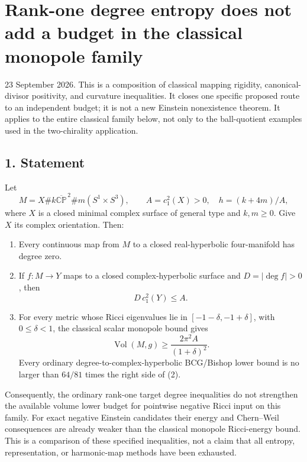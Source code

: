 \documentclass[
  11pt,
]{article}
\author{}
\date{23 September 2026}
\providecommand{\tightlist}{%
  \setlength{\itemsep}{0pt}\setlength{\parskip}{0pt}}
\begin{document}
\hypertarget{rank-one-degree-entropy-does-not-add-a-budget-in-the-classical-monopole-family}{%
\section{Rank-one degree entropy does not add a budget in the classical
monopole
family}\label{rank-one-degree-entropy-does-not-add-a-budget-in-the-classical-monopole-family}}

23 September 2026. This is a composition of classical mapping rigidity,
canonical-divisor positivity, and curvature inequalities. It closes one
specific proposed route to an independent budget; it is not a new
Einstein nonexistence theorem. It applies to the entire classical family
below, not only to the ball-quotient examples used in the two-chirality
application.

\hypertarget{statement}{%
\subsection{1. Statement}\label{statement}}

Let \[
 M=X\#k\overline{\mathbb {CP}}^{\,2}\#m(S^1\times S^3),\qquad
 A=c_1^2(X)>0,\quad h=(k+4m)/A,
\] where \(X\) is a closed minimal complex surface of general type and
\(k,m\ge0\). Give \(X\) its complex orientation. Then:

\begin{enumerate}
\def\labelenumi{\arabic{enumi}.}
\tightlist
\item
  Every continuous map from \(M\) to a closed real-hyperbolic
  four-manifold has degree zero.
\item
  If \(f:M\to Y\) maps to a closed complex-hyperbolic surface and
  \(D=|\deg f|>0\), then \[
  \boxed{D\,c_1^2(Y)\le A.}                              \tag{1}
  \]
\item
  For every metric whose Ricci eigenvalues lie in
  \([-1-\delta,-1+\delta]\), with \(0\le\delta<1\), the classical scalar
  monopole bound gives \[
  \boxed{\operatorname{Vol}(M,g)
         \ge\frac{2\pi^2 A}{(1+\delta)^2}.}              \tag{2}
  \] Every ordinary degree-to-complex-hyperbolic BCG/Bishop lower bound
  is no larger than \(64/81\) times the right side of (2).
\end{enumerate}

Consequently, the ordinary rank-one target degree inequalities do not
strengthen the available volume lower budget for pointwise negative
Ricci input on this family. For exact negative Einstein candidates their
energy and Chern--Weil consequences are already weaker than the
classical monopole Ricci-energy bound. This is a comparison of these
specified inequalities, not a claim that all entropy, representation, or
harmonic-map methods have been exhausted.
\end{document}
